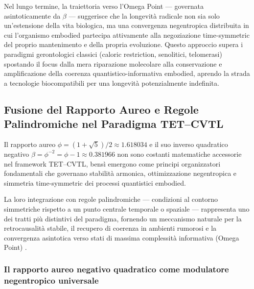 \documentclass[11pt,a4paper]{article}
\let\oldcite\cite
\renewcommand{\cite}{\protect\oldcite}
\theoremstyle{plain}
\theoremstyle{definition}
\begin{document}
\vspace{0.2cm}

Nel lungo termine, la traiettoria verso l'Omega Point — governata asintoticamente da $\beta$ — suggerisce che la longevità radicale non sia solo un'estensione della vita biologica, ma una convergenza negentropica distribuita in cui l'organismo embodied partecipa attivamente alla negoziazione time-symmetric del proprio mantenimento e della propria evoluzione. Questo approccio supera i paradigmi gerontologici classici (caloric restriction, senolitici, telomerasi) spostando il focus dalla mera riparazione molecolare alla conservazione e amplificazione della coerenza quantistico-informativa embodied, aprendo la strada a tecnologie biocompatibili per una longevità potenzialmente indefinita.










\subsection{Fusione del Rapporto Aureo e Regole Palindromiche nel Paradigma TET–CVTL}


\vspace{0.3cm}

Il rapporto aureo $\phi = (1 + \sqrt{5})/2 \approx 1.618034$ e il suo inverso quadratico negativo $\beta = \phi^{-2} = \phi - 1 \approx 0.381966$ non sono costanti matematiche accessorie nel framework TET–CVTL, bensì emergono come principi organizzatori fondamentali che governano stabilità armonica, ottimizzazione negentropica e simmetria time-symmetric dei processi quantistici embodied. 

\vspace{0.2cm}

La loro integrazione con regole palindromiche — condizioni al contorno simmetriche rispetto a un punto centrale temporale o spaziale — rappresenta uno dei tratti più distintivi del paradigma, fornendo un meccanismo naturale per la retrocausalità stabile, il recupero di coerenza in ambienti rumorosi e la convergenza asintotica verso stati di massima complessità informativa (Omega Point) \cite{petoukhov2018golden, elias2011golden}.

\vspace{0.2cm}

\subsubsection{Il rapporto aureo negativo quadratico come modulatore negentropico universale}
\end{document}
